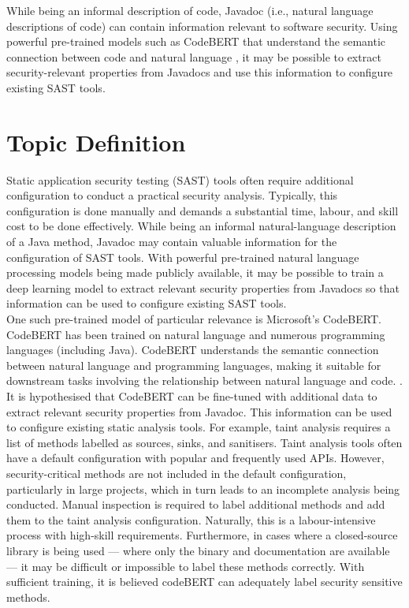 \noindent
While being an informal description of code, Javadoc (i.e., natural language descriptions of code) can contain information relevant to software security. Using powerful pre-trained models such as CodeBERT that understand the semantic connection between code and natural language \cite{CodeBERT}, it may be possible to extract security-relevant properties from Javadocs and use this information to configure existing SAST tools.\\

\section{Topic Definition}

\noindent
Static application security testing (SAST) tools often require additional configuration to conduct a practical security analysis. Typically, this configuration is done manually and demands a substantial time, labour, and skill cost to be done effectively. While being an informal natural-language description of a Java method, Javadoc may contain valuable information for the configuration of SAST tools. With powerful pre-trained natural language processing models being made publicly available, it may be possible to train a deep learning model to extract relevant security properties from Javadocs so that information can be used to configure existing SAST tools.\\

\noindent
One such pre-trained model of particular relevance is Microsoft's CodeBERT. CodeBERT has been trained on natural language and numerous programming languages (including Java). CodeBERT understands the semantic connection between natural language and programming languages, making it suitable for downstream tasks involving the relationship between natural language and code. \cite{CodeBERT}.\\

\noindent
It is hypothesised that CodeBERT can be fine-tuned with additional data to extract relevant security properties from Javadoc. This information can be used to configure existing static analysis tools. For example, taint analysis requires a list of methods labelled as sources, sinks, and sanitisers. Taint analysis tools often have a default configuration with popular and frequently used APIs. However, security-critical methods are not included in the default configuration, particularly in large projects, which in turn leads to an incomplete analysis being conducted. Manual inspection is required to label additional methods and add them to the taint analysis configuration. Naturally, this is a labour-intensive process with high-skill requirements. Furthermore, in cases where a closed-source library is being used --- where only the binary and documentation are available --- it may be difficult or impossible to label these methods correctly. With sufficient training, it is believed codeBERT can adequately label security sensitive methods.


  

